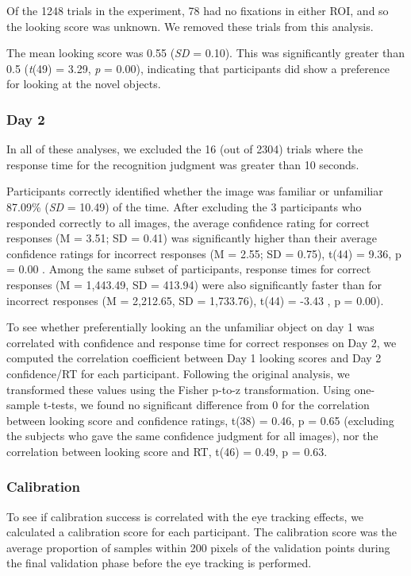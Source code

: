\documentclass[
  man,floatsintext]{apa6}
\begin{document}
Of the 1248 trials in the experiment, 78 had no fixations in either ROI, and so the looking score was unknown. We removed these trials from this analysis.

The mean looking score was 0.55 (\emph{SD} = 0.10). This was significantly greater than 0.5 (\emph{t}(49) = 3.29, \emph{p} = 0.00), indicating that participants did show a preference for looking at the novel objects.

\subsubsection{Day 2}\label{day-2}

In all of these analyses, we excluded the 16 (out of 2304) trials where the response time for the recognition judgment was greater than 10 seconds.

Participants correctly identified whether the image was familiar or unfamiliar 87.09\% (\emph{SD} = 10.49) of the time. After excluding the 3 participants who responded correctly to all images, the average confidence rating for correct responses (M = 3.51; SD = 0.41) was significantly higher than their average confidence ratings for incorrect responses (M = 2.55; SD = 0.75), t(44) = 9.36, p = 0.00 . Among the same subset of participants, response times for correct responses (M = 1,443.49, SD = 413.94) were also significantly faster than for incorrect responses (M = 2,212.65, SD = 1,733.76), t(44) = -3.43 , p = 0.00).

To see whether preferentially looking an the unfamiliar object on day 1 was correlated with confidence and response time for correct responses on Day 2, we computed the correlation coefficient between Day 1 looking scores and Day 2 confidence/RT for each participant. Following the original analysis, we transformed these values using the Fisher p-to-z transformation. Using one-sample t-tests, we found no significant difference from 0 for the correlation between looking score and confidence ratings, t(38) = 0.46, p = 0.65 (excluding the subjects who gave the same confidence judgment for all images), nor the correlation between looking score and RT, t(46) = 0.49, p = 0.63.

\subsubsection{Calibration}\label{calibration-3}

To see if calibration success is correlated with the eye tracking effects, we calculated a calibration score for each participant. The calibration score was the average proportion of samples within 200 pixels of the validation points during the final validation phase before the eye tracking is performed.
\end{document}
